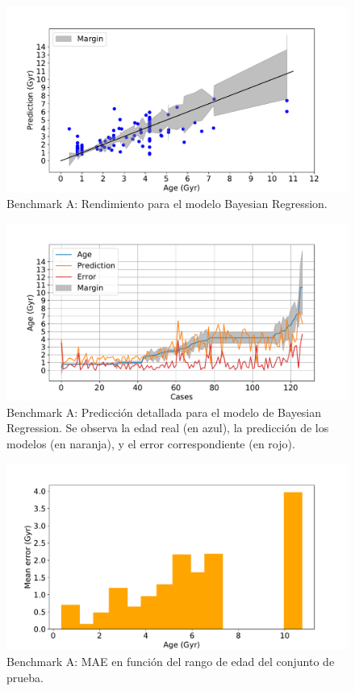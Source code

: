 \begin{figure}[H]
\begin{center}
 \includegraphics[width=0.8\linewidth]{Figuras/Experimentos/B_A_bayes_1.pdf}
\end{center}
\caption{Benchmark A: Rendimiento para el modelo Bayesian Regression.}
 \label{fig:benchA_details_bayes_1}
\end{figure}

\begin{figure}[H]
\begin{center}
 \includegraphics[width=0.8\linewidth]{Figuras/Experimentos/B_A_bayes_2.pdf}
\end{center}
\caption{Benchmark A: Predicción detallada para el modelo de Bayesian Regression. Se observa la edad real (en azul), la predicción de los modelos (en naranja), y el error correspondiente (en rojo).}
 \label{fig:benchA_details_bayes_2}
\end{figure}

\begin{figure}[H]
\begin{center}
 \includegraphics[width=0.8\linewidth]{Figuras/Experimentos/B_A_bayes_3.pdf}
\end{center}
\caption{Benchmark A: MAE en función del rango de edad del conjunto de prueba.}
 \label{fig:benchA_details_bayes_3}
\end{figure}


